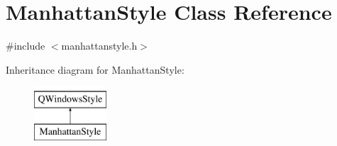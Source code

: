 \hypertarget{class_manhattan_style}{\section{Manhattan\-Style Class Reference}
\label{class_manhattan_style}
}


{\ttfamily \#include $<$manhattanstyle.\-h$>$}

Inheritance diagram for Manhattan\-Style\-:\begin{figure}[H]
\begin{center}
\leavevmode
\includegraphics[height=2.000000cm]{class_manhattan_style}
\end{center}
\end{figure}
